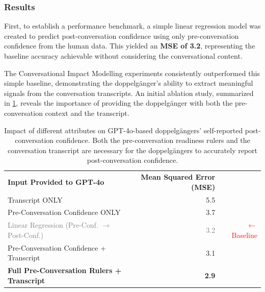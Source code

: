 \subsubsection{Results}
First, to establish a performance benchmark, a simple linear regression model was created to predict post-conversation confidence using only pre-conversation confidence from the human data. This yielded an \textbf{MSE of 3.2}, representing the baseline accuracy achievable without considering the conversational content.

The Conversational Impact Modelling experiments consistently outperformed this simple baseline, demonstrating the doppelgänger's ability to extract meaningful signals from the conversation transcripts. An initial ablation study, summarized in \cref{tab:ablation_results}, reveals the importance of providing the doppelgänger with both the pre-conversation context and the transcript.



\begin{table}[ht!]
\centering
\begin{tabular}{@{}lrr@{}}
\cmidrule(r){1-2}
\textbf{Input Provided to GPT-4o} & \textbf{Mean Squared Error (MSE)} & \\
\cmidrule(r){1-2}
Transcript ONLY & 5.5 & \\
Pre-Conversation Confidence ONLY & 3.7 & \\
\textcolor{gray}{Linear Regression (Pre-Conf. $\rightarrow$ Post-Conf.)} & \textcolor{gray}{3.2} & \textcolor{red}{\small $\leftarrow$ Baseline} \\
Pre-Conversation Confidence + Transcript & 3.1 & \\
\textbf{Full Pre-Conversation Rulers + Transcript} & \textbf{2.9} & \\
\cmidrule(r){1-2}
\end{tabular}
\caption[Ablation study on doppelgängers' self-reported post-conversation confidence]{Impact of different attributes on GPT-4o-based doppelgängers' self-reported post-conversation confidence. Both the pre-conversation readiness rulers and the conversation transcript are necessary for the doppelgängers to accurately report post-conversation confidence.}
\label{tab:ablation_results}
\end{table}




